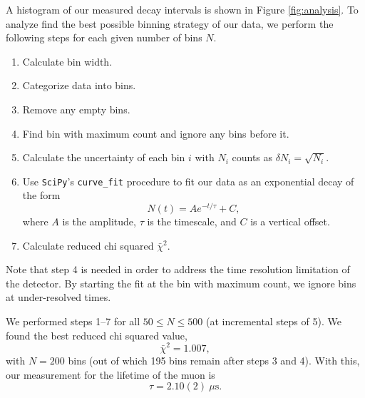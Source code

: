 \documentclass{../paper}
\begin{document}
A histogram of our measured decay intervals is shown in Figure \ref{fig:analysis}. To analyze find the best possible binning strategy of our data, we perform the following steps for each given number of bins $N$.
\begin{enumerate}
  \item Calculate bin width.
  \item Categorize data into bins.
  \item Remove any empty bins.
  \item Find bin with maximum count and ignore any bins before it.
  \item Calculate the uncertainty of each bin $i$ with $N_i$ counts as $\delta N_i = \sqrt{N_i}$.
  \item Use {\tt SciPy}'s {\tt curve\_fit} procedure \cite{SciPy} to fit our data as an exponential decay of the form
    \begin{equation}
      N(t) = A e^{-t/\tau} + C,
    \end{equation}
    where $A$ is the amplitude, $\tau$ is the timescale, and $C$ is a vertical offset.
  \item Calculate reduced chi squared $\bar\chi^2$.
\end{enumerate}

Note that step 4 is needed in order to address the time resolution limitation of the detector. By starting the fit at the bin with maximum count, we ignore bins at under-resolved times.

We performed steps 1--7 for all $50 \leq N \leq 500$ (at incremental steps of 5). We found the best reduced chi squared value,
\begin{equation}
  \bar\chi^2 = 1.007,
\end{equation}
with $N=200$ bins (out of which 195 bins remain after steps 3 and 4). With this, our measurement for the lifetime of the muon is
\begin{equation}\label{eq:muon-decay-value}
  \tau = 2.10(2) \ \mu\text{s}.
\end{equation}
\end{document}
